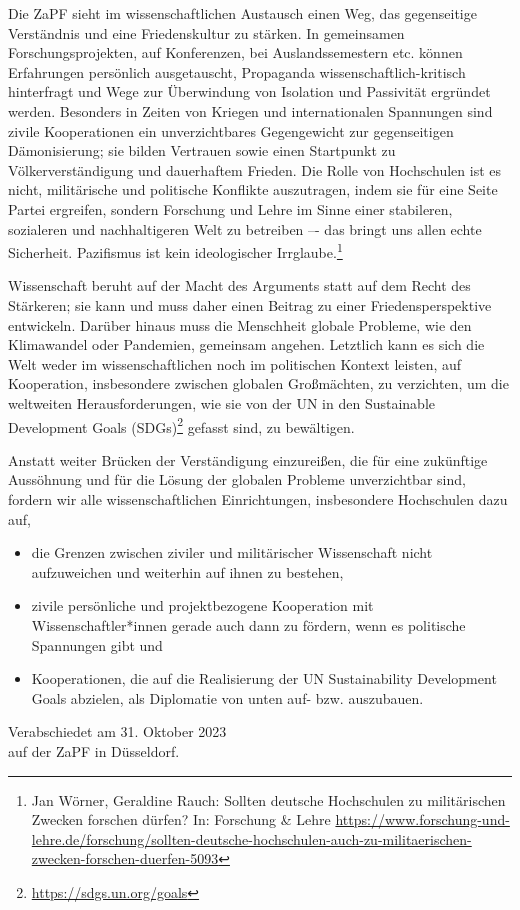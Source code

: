 \documentclass[DIV=calc]{scrartcl}
\let\oldgrqq=\grqq
\def\grqq{\oldgrqq\xspace}
\begin{document}
Die ZaPF sieht im wissenschaftlichen Austausch einen Weg, das gegenseitige Verständnis und eine Friedenskultur zu stärken. In gemeinsamen Forschungsprojekten, auf Konferenzen, bei Auslandssemestern etc. können Erfahrungen persönlich ausgetauscht, Propaganda wissenschaftlich-kritisch hinterfragt und Wege zur Überwindung von Isolation und Passivität ergründet werden. Besonders in Zeiten von Kriegen und internationalen Spannungen sind zivile Kooperationen ein unverzichtbares Gegengewicht zur gegenseitigen Dämonisierung; sie bilden Vertrauen sowie einen Startpunkt zu Völkerverständigung und dauerhaftem Frieden. \glqq Die Rolle von Hochschulen ist es nicht, militärische und politische Konflikte auszutragen\grqq{}, indem sie für eine Seite Partei ergreifen, \glqq sondern Forschung und Lehre im Sinne einer stabileren, sozialeren und nachhaltigeren Welt zu betreiben –- das bringt uns allen echte Sicherheit. Pazifismus ist kein ideologischer Irrglaube.\grqq{}\footnote{Jan Wörner, Geraldine Rauch: \glqq Sollten deutsche Hochschulen zu militärischen Zwecken forschen dürfen?\grqq In: Forschung \& Lehre \url{https://www.forschung-und- lehre.de/forschung/sollten-deutsche-hochschulen-auch-zu-militaerischen-zwecken-forschen-duerfen-5093}}

Wissenschaft beruht auf der Macht des Arguments statt auf dem Recht des Stärkeren; sie kann und muss daher einen Beitrag zu einer Friedensperspektive entwickeln. Darüber hinaus muss die Menschheit globale Probleme, wie den Klimawandel oder Pandemien, gemeinsam angehen. Letztlich kann es sich die Welt weder im wissenschaftlichen noch im politischen Kontext leisten, auf Kooperation, insbesondere zwischen globalen Großmächten, zu verzichten, um die weltweiten Herausforderungen, wie sie von der UN in den Sustainable Development Goals (SDGs)\footnote{\url{https://sdgs.un.org/goals}} gefasst sind, zu bewältigen.\newpage

Anstatt weiter Brücken der Verständigung einzureißen, die für eine zukünftige Aussöhnung und für die Lösung der globalen Probleme unverzichtbar sind, fordern wir alle wissenschaftlichen Einrichtungen, insbesondere Hochschulen dazu auf,
\begin{itemize}
    \item die Grenzen zwischen ziviler und militärischer Wissenschaft nicht aufzuweichen und weiterhin auf ihnen zu bestehen,
    \item zivile persönliche und projektbezogene Kooperation mit Wissenschaftler*innen gerade auch dann zu fördern, wenn es politische Spannungen gibt und
    \item Kooperationen, die auf die Realisierung der UN Sustainability Development Goals abzielen, als \glqq Diplomatie von unten\grqq auf- bzw. auszubauen.
\end{itemize}


%
\vfill
\begin{flushright}
	Verabschiedet am 31. Oktober 2023 \\
	auf der ZaPF in Düsseldorf.
\end{flushright}
\end{document}
